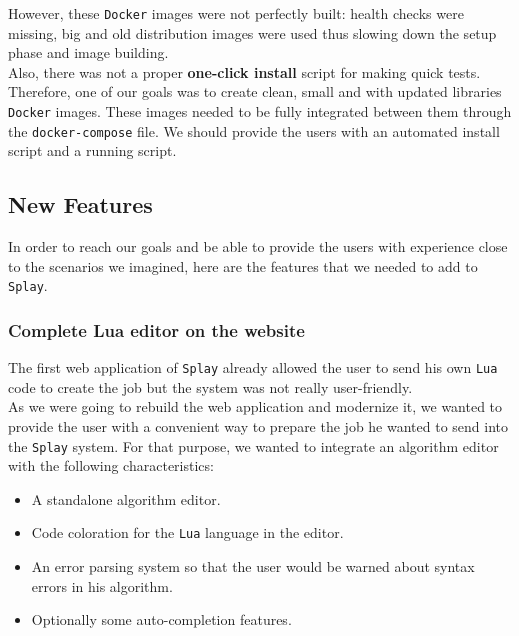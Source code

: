 \documentclass{eplmastersthesis}
\begin{document}
          However, these \texttt{Docker} images were not perfectly built: health checks
          were missing, big and old distribution images were used thus slowing down the
          setup phase and image building.\\
          Also, there was not a proper \textbf{one-click install} script for
          making quick tests.\\
          Therefore, one of our goals was to create clean, small and with
          updated libraries \texttt{Docker} images. These images needed to be fully
          integrated between them through the \texttt{docker-compose} file. We should
          provide the users with an automated install script and a running
          script.

      \subsection{New Features}

        In order to reach our goals and be able to provide the users with
        experience close to the scenarios we imagined, here are the
        features that we needed to add to \texttt{Splay}.

        \subsubsection{Complete Lua editor on the website}

          The first web application of \texttt{Splay} already allowed the user to send
          his own \texttt{Lua} code to create the job but the system was not really
          user-friendly.\\

          As we were going to rebuild the web application and modernize it,
          we wanted to provide the user with a convenient way to prepare
          the job he wanted to send into the \texttt{Splay} system. For that purpose,
          we wanted to integrate an algorithm editor with the following
          characteristics:

          \begin{itemize}
            \item A standalone algorithm editor.
            \item Code coloration for the \texttt{Lua} language in the editor.
            \item An error parsing system so that the user would be warned
            about syntax errors in his algorithm.
            \item Optionally some auto-completion features.
          \end{itemize}
\end{document}
